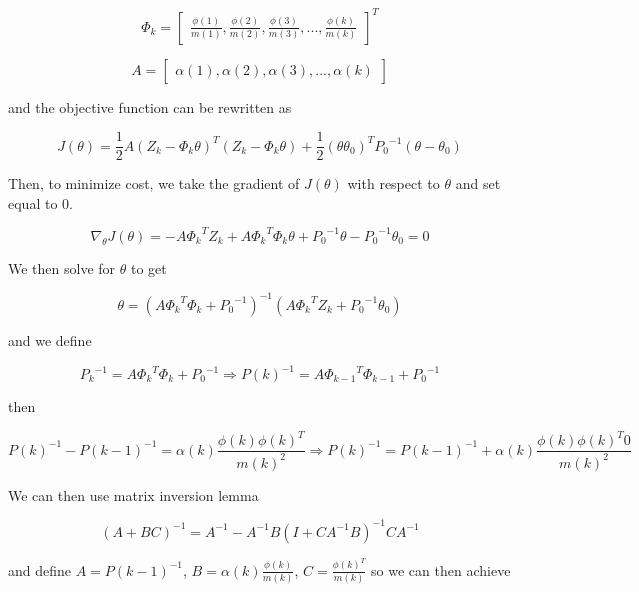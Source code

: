 \documentclass{article}
\begin{document}
\[
\Phi_k =
\begin{bmatrix}
\frac{\phi(1)}{m(1)},\frac{\phi(2)}{m(2)},\frac{\phi(3)}{m(3)},...,\frac{\phi(k)}{m(k)}
\end{bmatrix}^T
\]

\[
A = 
\begin{bmatrix}
\alpha(1),\alpha(2),\alpha(3),...,\alpha(k)
\end{bmatrix}
\]

and the objective function can be rewritten as

\begin{equation}
J(\theta) = \frac{1}{2} A (Z_k - \Phi_k \theta)^T (Z_k - \Phi_k \theta) + \frac{1}{2} (\theta \theta_0)^T {P_0}^{-1} (\theta - \theta_0)
\end{equation}

Then, to minimize cost, we take the gradient of $J(\theta)$ with respect to $\theta$ and set equal to $0$.

\begin{equation}
\nabla_\theta J(\theta) = -A {\Phi_k}^T Z_k + A {\Phi_k}^T \Phi_k \theta + {P_0}^{-1} \theta - {P_0}^{-1} \theta_0 = 0
\end{equation}

We then solve for $\theta$ to get

\begin{equation}
\theta = (A {\Phi_k}^T \Phi_k + {P_0}^{-1})^{-1} (A {\Phi_k}^T Z_k + {P_0}^{-1} \theta_0)
\end{equation}

and we define

\begin{equation}
{P_k}^{-1} = A {\Phi_k}^T \Phi_k + {P_0}^{-1} \Rightarrow P(k)^{-1} = A {\Phi_{k-1}}^T \Phi_{k-1} + {P_0}^{-1}
\end{equation}

then

\begin{equation}
P(k)^{-1} - P(k-1)^{-1} = \alpha (k) \frac{\phi(k)\phi(k)^T}{m(k)^2} \Rightarrow P(k)^{-1} = P(k-1)^{-1} + \alpha (k) \frac{\phi(k)\phi(k)^T0}{m(k)^2}
\end{equation}

We can then use matrix inversion lemma

\begin{equation}
(A+BC)^{-1} = A^{-1}-A^{-1}B(I+CA^{-1}B)^{-1}CA^{-1}
\end{equation}

and define $A=P(k-1)^{-1}$, $B=\alpha(k)\frac{\phi(k)}{m(k)}$, $C=\frac{\phi(k)^T}{m(k)}$ so we can then achieve
\end{document}
